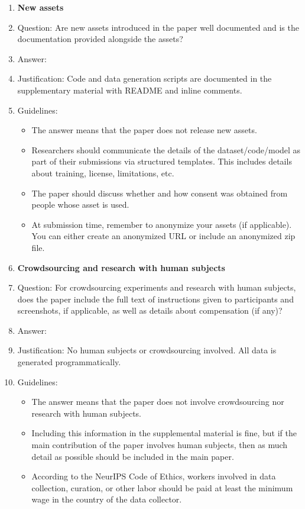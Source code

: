 \documentclass{article}
\begin{document}
\begin{enumerate}
\item {\bf New assets}
    \item[] Question: Are new assets introduced in the paper well documented and is the documentation provided alongside the assets?
    \item[] Answer: \answerYes{}
    \item[] Justification: Code and data generation scripts are documented in the supplementary material with README and inline comments.
    \item[] Guidelines:
    \begin{itemize}
        \item The answer \answerNA{} means that the paper does not release new assets.
        \item Researchers should communicate the details of the dataset\slash code\slash model as part of their submissions via structured templates. This includes details about training, license, limitations, etc.
        \item The paper should discuss whether and how consent was obtained from people whose asset is used.
        \item At submission time, remember to anonymize your assets (if applicable). You can either create an anonymized URL or include an anonymized zip file.
    \end{itemize}

\item {\bf Crowdsourcing and research with human subjects}
    \item[] Question: For crowdsourcing experiments and research with human subjects, does the paper include the full text of instructions given to participants and screenshots, if applicable, as well as details about compensation (if any)?
    \item[] Answer: \answerNA{}
    \item[] Justification: No human subjects or crowdsourcing involved. All data is generated programmatically.
    \item[] Guidelines:
    \begin{itemize}
        \item The answer \answerNA{} means that the paper does not involve crowdsourcing nor research with human subjects.
        \item Including this information in the supplemental material is fine, but if the main contribution of the paper involves human subjects, then as much detail as possible should be included in the main paper.
        \item According to the NeurIPS Code of Ethics, workers involved in data collection, curation, or other labor should be paid at least the minimum wage in the country of the data collector.
    \end{itemize}


\end{enumerate}
\end{document}

